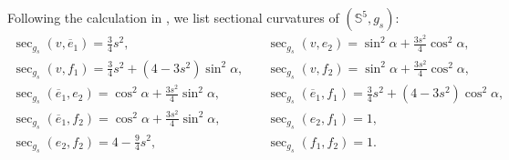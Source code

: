 \documentclass[11pt,letterpaper]{amsart}
\newcommand{\ove}{\overline{e}}
\newcommand{\bS}{\mathbb{S}}
\theoremstyle{definition}
\theoremstyle{remark}
\numberwithin{equation}{section}
\begin{document}
Following the calculation in \cite{Ziller-Bergersphere}, we list sectional curvatures of $(\bS^5, g_s)$:
\begin{equation*}
\begin{split}
    \sec_{g_s}(v, \ove_1)=\frac{3}{4}s^2, \quad & \sec_{g_s}(v, e_2)=\sin^2 \alpha+\frac{3s^2}{4}\cos^2\alpha,\\
    \sec_{g_s}(v, f_1)=\frac{3}{4}s^2+(4-3s^2)\sin^2 \alpha, \quad& \sec_{g_s}(v, f_2)=\sin^2 \alpha+\frac{3s^2}{4}\cos^2\alpha,\\
    \sec_{g_s}(\ove_1,e_2)=\cos^2 \alpha+\frac{3s^2}{4}\sin^2\alpha, \quad & \sec_{g_s}(\ove_1,f_1)=\frac{3}{4}s^2+(4-3s^2)\cos^2 \alpha,\\
    \sec_{g_s}(\ove_1,f_2)=\cos^2 \alpha+\frac{3s^2}{4}\sin^2\alpha, \quad & \sec_{g_s}(e_2,f_1)=1,\\
    \sec_{g_s}(e_2,f_2)=4-\frac{9}{4}s^2, \quad & \sec_{g_s}(f_1,f_2)=1.
    \end{split}
\end{equation*}
\end{document}
